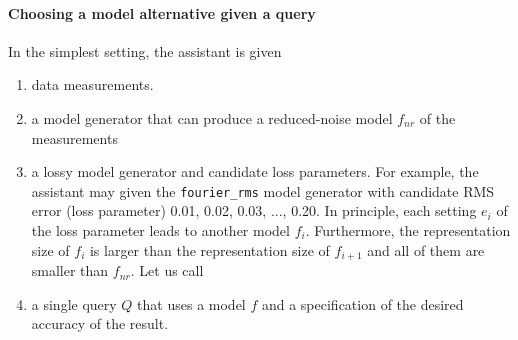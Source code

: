 {\paragraph{Choosing a model alternative given a query}
In the simplest setting, the assistant is given
\begin{enumerate} 
%
\item data measurements.
%
\item a model generator that can produce a reduced-noise model $f_{nr}$ of the measurements
%
\item a lossy model generator and candidate loss parameters. For example, the assistant may given the \texttt{fourier\_rms} model generator with candidate RMS error (loss parameter) 0.01, 0.02, 0.03, ..., 0.20. In principle, each setting $e_i$ of the loss parameter leads to another model $f_i$. Furthermore, the representation size of $f_i$ is larger than the representation size of $f_{i+1}$ and all of them are smaller than $f_{nr}$. Let us call 
%
\item a single query $Q$ that uses a model $f$ and a specification of the desired accuracy of the result.
%
\end{enumerate}
}
